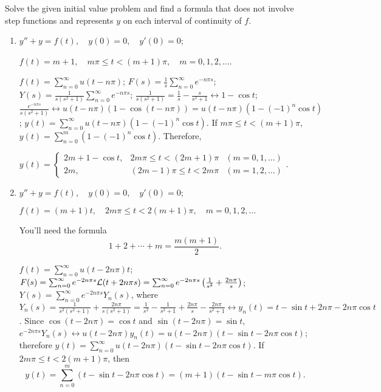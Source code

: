 \documentclass{ximera}
\begin{document}
\begin{problem}\label{exer:8.5.22} Solve the given initial value problem and find a
formula that does not involve step functions and represents $y$ on
each interval of continuity of $f$.
\begin{enumerate}
\item %
$y''+y=f(t), \quad  y(0)=0,\quad  y'(0)=0$;

$f(t)=m+1,\quad  m\pi\le t<(m+1)\pi,\quad m=0,1,2,\dots$.

\begin{solution}
$f(t)=\sum_{n=0}^\infty u(t-n\pi)$; $F(s)=\frac{1}{s}\sum_{n=0}^\infty e^{-n\pi s}$; $Y(s)=\frac{1}{s(s^2+1)}\sum_{n=0}^\infty e^{-n\pi s}$;
 $\frac{1}{s(s^2+1)}=\frac{1}{s}-\frac{s}{s^2+1}
\leftrightarrow 1-\cos t$;
 $\frac{e^{-n\pi s}}{s(s^2+1)}\leftrightarrow
u(t-n\pi)(1-\cos(t-n\pi))=u(t-n\pi)(1-(-1)^n\cos t)$;
$y(t)=\sum_{n=0}^\infty u(t-n\pi)(1-(-1)^n\cos t)$. If $m\pi\le t<(m+1)\pi$,
$y(t)=\sum_{n=0}^m (1-(-1)^n\cos t)$. Therefore,

$y(t)=\left\{\begin{array}{cll}2m+1-\cos t,&2m\pi\le
t<(2m+1)\pi&(m=0,1,\dots)\\ 2m,&(2m-1)\pi\le
t<2m\pi&(m=1,2,\dots)\end{array}\right.$.

\end{solution}

\item %
$y''+y=f(t), \quad  y(0)=0,\quad y'(0)=0$;

$f(t)=(m+1)t, \quad   2m\pi\le t<2(m+1)\pi,\quad m=0,1,2,\dots$

\begin{hint}
You'll need the formula
$$
1+2+\cdots+m=\frac{m(m+1)}{2}.
$$  
\end{hint}

\begin{solution}
$f(t)=\sum_{n=0}^\infty u(t-2n\pi)t$;
 $F(s)=\sum_{n=0}^\infty e^{-2n\pi s}{\cal L}(t+2n\pi s)=
\sum_{n=0}^\infty e^{-2n\pi s}\left(\frac{1}{s^2}+\frac{2n\pi}{s}\right)$;
$Y(s)=\sum_{n=0}^\infty e^{-2n\pi s}Y_n(s)$, where
$Y_n(s)=\frac{1}{s^2(s^2+1)}+\frac{2n\pi}{s(s^2+1)}
=\frac{1}{s^2}-\frac{1}{s^2+1}+\frac{2n\pi}{s}-\frac{2n\pi}{s^2+1}
\leftrightarrow y_n(t)=t-\sin t+2n\pi-2n\pi\cos t$.
Since $\cos(t-2n\pi)=\cos t$ and $\sin(t-2n\pi)=\sin t$,
$e^{-2n\pi s}Y_n(s)\leftrightarrow
u(t-2n\pi)y_n(t)=u(t-2n\pi)(t-\sin t-2n\pi\cos t)$; therefore
$y(t)=\sum_{n=0}^\infty u(t-2n\pi)(t-\sin t-2n\pi\cos t)$.
If $2m\pi\le t<2(m+1)\pi$, then
$$
y(t)=\sum_{n=0}^m (t-\sin t-2n\pi\cos t)=
(m+1)(t-\sin t-m\pi\cos t).
$$
\end{solution}


\end{enumerate}
\end{problem}
\end{document}
